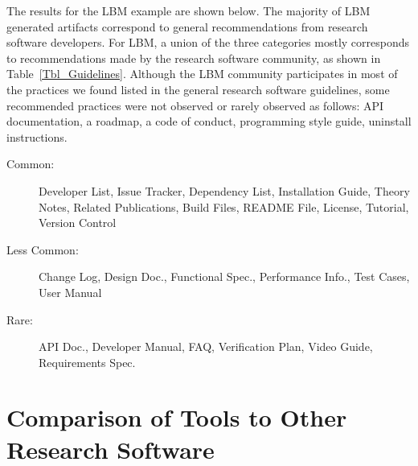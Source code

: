 \documentclass[runningheads]{llncs}
\begin{document}
The results for the LBM example are shown below.  The majority of LBM generated
artifacts correspond to general recommendations from research software
developers.  For LBM, a union of the three categories mostly corresponds to
recommendations made by the research software community, as shown in
Table~\ref{Tbl_Guidelines}. Although the LBM community participates in most of
the practices we found listed in the general research software guidelines, some
recommended practices were not observed or rarely observed as follows: API
documentation, a roadmap, a code of conduct, programming style guide, uninstall
instructions.

\begin{description}
	\item[Common:] Developer List, Issue Tracker, Dependency List, Installation
	Guide, Theory Notes, Related Publications, Build Files, README File,
	License, Tutorial, Version Control
	\item[Less Common:] Change Log, Design Doc., Functional Spec., Performance
	Info., Test Cases, User Manual
	\item[Rare:] API Doc., Developer Manual, FAQ, Verification Plan, Video Guide,
	Requirements Spec.
\end{description}


\section{Comparison of Tools to Other Research Software}
\label{Sec_CompareTools}
\end{document}
